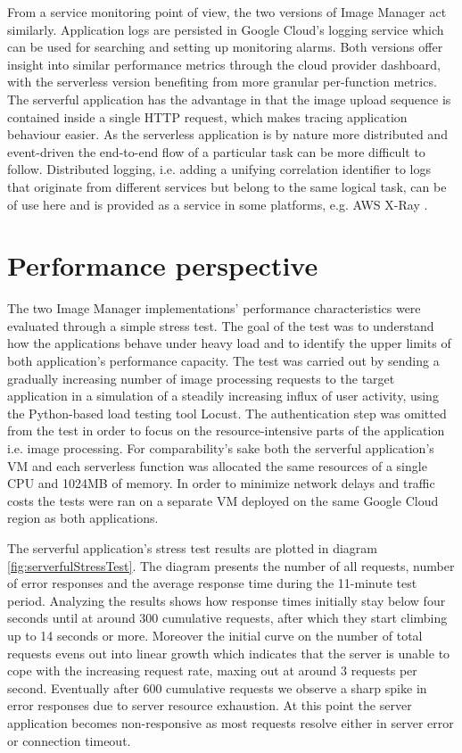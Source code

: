 From a service monitoring point of view, the two versions of Image Manager act similarly. Application logs are persisted in Google Cloud's logging service which can be used for searching and setting up monitoring alarms. Both versions offer insight into similar performance metrics through the cloud provider dashboard, with the serverless version benefiting from more granular per-function metrics. The serverful application has the advantage in that the image upload sequence is contained inside a single HTTP request, which makes tracing application behaviour easier. As the serverless application is by nature more distributed and event-driven the end-to-end flow of a particular task can be more difficult to follow. Distributed logging, i.e. adding a unifying correlation identifier to logs that originate from different services but belong to the same logical task, can be of use here and is provided as a service in some platforms, e.g. AWS X-Ray \parencite{awslambda0218}.

\section{Performance perspective}

The two Image Manager implementations' performance characteristics were evaluated through a simple stress test. The goal of the test was to understand how the applications behave under heavy load and to identify the upper limits of both application's performance capacity. The test was carried out by sending a gradually increasing number of image processing requests to the target application in a simulation of a steadily increasing influx of user activity, using the Python-based load testing tool Locust. The authentication step was omitted from the test in order to focus on the resource-intensive parts of the application i.e. image processing. For comparability's sake both the serverful application's VM and each serverless function was allocated the same resources of a single CPU and 1024MB of memory. In order to minimize network delays and traffic costs the tests were ran on a separate VM deployed on the same Google Cloud region as both applications.

The serverful application's stress test results are plotted in diagram \ref{fig:serverfulStressTest}. The diagram presents the number of all requests, number of error responses and the average response time during the 11-minute test period. Analyzing the results shows how response times initially stay below four seconds until at around 300 cumulative requests, after which they start climbing up to 14 seconds or more. Moreover the initial curve on the number of total requests evens out into linear growth which indicates that the server is unable to cope with the increasing request rate, maxing out at around 3 requests per second. Eventually after 600 cumulative requests we observe a sharp spike in error responses due to server resource exhaustion. At this point the server application becomes non-responsive as most requests resolve either in server error or connection timeout.


